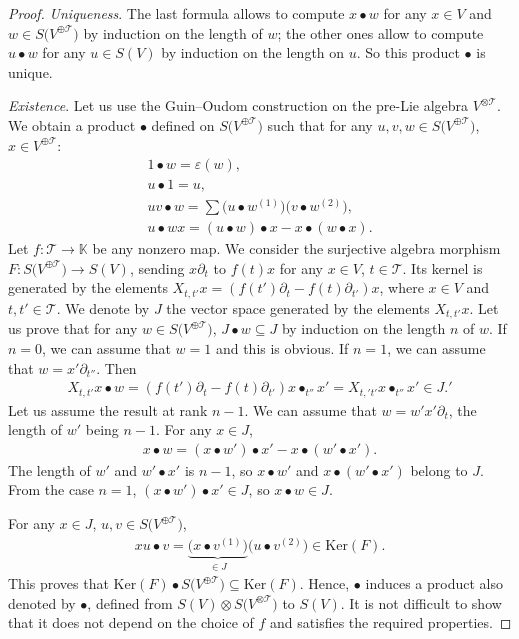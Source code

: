 \documentclass[pdftex]{sigma}
\numberwithin{equation}{section}
\newcommand{\K}{\mathbb{K}}
\newcommand{\T}{\mathcal{T}}
\renewcommand{\ker}{\mathrm{Ker}}
\begin{document}
\begin{proof} \textit{Uniqueness}. The last formula allows to compute $x\bullet w$ for any $x\in V$
and $w\in S\big(V^{\oplus\T}\big)$ by induction on the length of $w$;
the other ones allow to compute $u\bullet w$ for any $u\in S(V)$ by induction on the length on $u$.
So this product $\bullet$ is unique.

\textit{Existence}. Let us use the Guin--Oudom construction \cite{Guin1,Guin2} on the pre-Lie algebra $V^{\otimes \T}$.
We obtain a product $\bullet$
defined on $S\big(V^{\oplus\T}\big)$ such that for any $u,v,w\in S\big(V^{\oplus\T}\big)$, $x\in V^{\oplus \T}$:
\begin{gather*}
1\bullet w=\varepsilon(w),
\\
u\bullet 1=u,
\\
uv\bullet w=\sum \big(u\bullet w^{(1)}\big)\big(v\bullet w^{(2)}\big),
\\
u\bullet w x=(u\bullet w)\bullet x-x\bullet (w\bullet x).
\end{gather*}
Let $f\colon \T\longrightarrow \K$ be any nonzero map. We consider the surjective algebra morphism
$F\colon S\big(V^{\oplus\T}\big)\allowbreak\longrightarrow S(V)$,
sending $x\partial_t$ to $f(t)x$ for any $x\in V$, $t\in \T$. Its kernel is generated by the elements
$X_{t,t'}x=(f(t')\partial_t-f(t)\partial_{t'})x$,
where $x\in V$ and $t,t'\in \T$. We denote by $J$ the vector space generated by the elements $X_{t,t'}x$.
Let us prove that for any $w\in S\big(V^{\oplus\T}\big)$, $J\bullet w\subseteq J$ by induction on the length $n$ of $w$.
If $n=0$, we can assume that $w=1$ and this is obvious. If $n=1$, we can assume that $w=x'\partial_{t''}$. Then
\begin{gather*}
X_{t,t'}x\bullet w=(f(t')\partial_t-f(t)\partial_{t'}) x\bullet_{t''} x'
=X_{t,'t'}x\bullet_{t''} x' \in J.'
\end{gather*}
Let us assume the result at rank $n-1$. We can assume that $w=w' x'\partial_t$, the length of $w'$ being $n-1$.
For any $x\in J$,
\begin{gather*}
x\bullet w=(x\bullet w')\bullet x'-x\bullet(w'\bullet x').
\end{gather*}
The length of $w'$ and $w'\bullet x'$ is $n-1$, so $x\bullet w'$ and $x\bullet (w'\bullet x')$ belong to $J$.
From the case $n=1$,
$(x\bullet w')\bullet x'\in J$, so $x\bullet w\in J$.

For any $x\in J$, $u,v\in S\big(V^{\oplus\T}\big)$,
\begin{gather*}
xu\bullet v=\underbrace{\big(x\bullet v^{(1)}\big)}_{\in J} \big(u\bullet v^{(2)}\big) \in \ker(F).
\end{gather*}
This proves that $\ker(F)\bullet S\big(V^{\oplus\T}\big)\subseteq \ker(F)$. Hence, $\bullet$ induces a product also denoted by $\bullet$,
defined from $S(V)\otimes S\big(V^{\otimes \T}\big)$ to $S(V)$. It is not difficult to show that it does not depend on the choice of $f$
and satisfies the required properties.
\end{proof}
\end{document}
